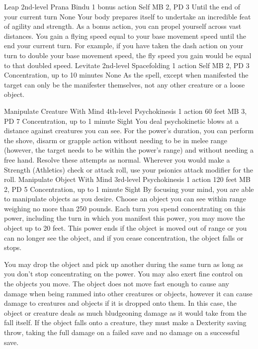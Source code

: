 \DndPowerHeader%
    {Leap\label{pwr:leap}}
    {2nd-level Prana Bindu}
    {1 bonus action}
    {Self}
    {MB 2, PD 3}
    {Until the end of your current turn}
    {None}
Your body prepares itself to undertake an
incredible feat of agility and strength. As a bonus action,
you can propel yourself across vast distances. You gain a
flying speed equal to your base movement speed until the end
your current turn. For example, if you have taken the dash
action on your turn to double your base movement speed, the
fly speed you gain would be equal to that doubled speed.
\DndPowerHeader%
    {Levitate\label{pwr:levitate}}
    {2nd-level Spacefolding}
    {1 action}
    {Self}
    {MB 2, PD 3}
    {Concentration, up to 10 minutes}
    {None}
As the  spell, except when
manifested the target can only be the manifester themselves,
not any other creature or a loose object.

\DndPowerHeader%
    {Manipulate Creature With Mind\label{pwr:manipulate-creature-with-mind}}
    {4th-level Psychokinesis}
    {1 action}
    {60 feet}
    {MB 3, PD 7}
    {Concentration, up to 1 minute}
    {Sight}
You deal psychokinetic blows at a distance
against creatures you can see. For the power's duration,
you can perform the shove, disarm or grapple action without
needing to be in melee range (however, the target needs to
be within the power's range) and without needing a free hand.
Resolve these attempts as normal. Wherever you
would make a Strength (Athletics) check or attack roll, use
your psionics attack modifier for the roll.
\DndPowerHeader%
    {Manipulate Object With Mind\label{pwr:manipulate-object-with-mind}}
    {3rd-level Psychokinesis}
    {1 action}
    {120 feet}
    {MB 2, PD 5}
    {Concentration, up to 1 minute}
    {Sight}
By focusing your mind, you are able to manipulate
objects as you desire. Choose an object you can see within
range weighing no more than 250 pounds. Each turn you spend
concentrating on this power, including the turn in which you
manifest this power, you may move the object up to 20 feet.
This power ends if the object is moved out of range or you
can no longer see the object, and if you cease concentration,
the object falls or stops.

You may drop the object and pick up another during the same
turn as long as you don't stop concentrating on the power.
You may also exert fine control on the objects you move. The
object does not move fast enough to cause any damage when
being rammed into other creatures or objects, however it can
cause damage to creatures and objects if it is dropped onto
them. In this case,
the object or creature deals as much bludgeoning
damage as it would take from the fall itself. If the object
falls onto a creature, they must make a Dexterity saving throw,
taking the full damage on a failed save and no damage on a
successful save.

